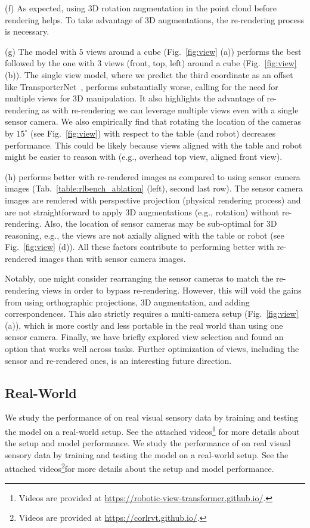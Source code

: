 (f) As expected, using 3D rotation augmentation in the point cloud before rendering helps. To take advantage of 3D augmentations, the re-rendering process is necessary. 

(g) The model with $5$ views around a cube (Fig.~\ref{fig:view} (a)) performs the best followed by the one with $3$ views (front, top, left) around a cube (Fig.~\ref{fig:view} (b)). The single view model, where we predict the third coordinate as an offset like TransporterNet~\cite{transporter2021}, performs substantially worse, calling for the need for multiple views for 3D manipulation. It also highlights the advantage of re-rendering as with re-rendering we can leverage multiple views even with a single sensor camera. We also empirically find that rotating the location of the cameras by $15^{\circ}$ (see Fig.~\ref{fig:view}) with respect to the table (and robot) decreases performance. This could be likely because views aligned with the table and robot might be easier to reason with (e.g., overhead top view, aligned front view).

(h) \method performs better with re-rendered images as compared to using sensor camera images (Tab.~\ref{table:rlbench_ablation} (left), second last row). The sensor camera images are rendered with perspective projection (physical rendering process) and are not straightforward to apply 3D augmentations (e.g., rotation) without re-rendering. Also, the location of sensor cameras may be sub-optimal for 3D reasoning, e.g., the views are not axially aligned with the table or robot (see Fig.~\ref{fig:view} (d)). All these factors contribute to \method performing better with re-rendered images than with sensor camera images. 

Notably, one might consider rearranging the sensor cameras to match the re-rendering views in order to bypass re-rendering. However, this will void the gains from using orthographic projections, 3D augmentation, and adding correspondences. This also strictly requires a multi-camera setup (Fig.~\ref{fig:view} (a)), which is more costly and less portable in the real world than using one sensor camera. Finally, we have briefly explored view selection and found an option that works well across tasks. Further optimization of views, including the sensor and re-rendered ones, is an interesting future direction.

\subsection{Real-World}
\label{sec:exp_real}
\ifarxiv
We study the performance of \method on real visual sensory data by training and testing the model on a real-world setup. See the attached videos\footnote{\label{footnote:video}Videos are provided at \href{https://robotic-view-transformer.github.io/}{https://robotic-view-transformer.github.io/}.}
for more details about the setup and model performance.
\else
We study the performance of \method on real visual sensory data by training and testing the model on a real-world setup. See the attached videos\footnote{\label{footnote:video}Videos are provided at \href{https://corlrvt.github.io/}{https://corlrvt.github.io/}.}for more details about the setup and model performance.
\fi

